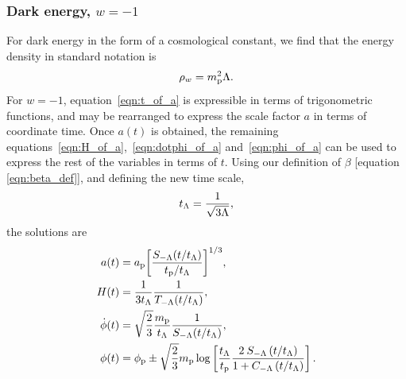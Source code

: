 \subsubsection{Dark energy, $w=-1$}
For dark energy in the form of a cosmological constant, we find that the energy density in standard notation is
%
\begin{equation}
  \rho_w = m_{\mathrm{p}}^2\Lambda.
\end{equation}
%
For $w=-1$, equation~\eqref{eqn:t_of_a} is expressible in terms of trigonometric functions, and may be rearranged to express the scale factor $a$ in terms of coordinate time. Once $a(t)$ is obtained, the remaining equations~\eqref{eqn:H_of_a},~\eqref{eqn:dotphi_of_a} and~\eqref{eqn:phi_of_a} can be used to express the rest of the variables in terms of $t$. Using our definition of $\beta$ [equation \nolinebreak\ref{eqn:beta_def}], and defining the new time scale,
%
\begin{equation}
  t_\mathrm{\Lambda} = \frac{1}{\sqrt{3\Lambda}},
  \label{eqn:tl}
\end{equation}
%
the solutions are
%
\begin{align}
  a(t)
  &=
  a_{\mathrm{p}}{\left[{\frac {S_{-\Lambda}(t/t_\mathrm{\Lambda})}{t_{\mathrm{p}}/t_\mathrm{\Lambda}}}\right]}^{1/3},
  \\
  H(t)
  &=
  \frac{1}{3t_\mathrm{\Lambda}}\frac{1}{T_{-\Lambda}(t/t_\mathrm{\Lambda})},
  \\
  \dot{\phi}(t)
  &=
  \sqrt{\frac{2}{3}}\frac{m_{\mathrm{p}}}{t_\mathrm{\Lambda}}\frac{1}{S_{-\Lambda}(t/t_\mathrm{\Lambda})},
  \\
  \phi(t)
  &=
  \phi_{\mathrm{p}} \pm \sqrt{\frac{2}{3}}m_{\mathrm{p}}
  \log\left[
  \frac{t_\mathrm{\Lambda}}{t_{\mathrm{p}}} 
  \frac 
  {2\: S_{-\Lambda} \left( t/t_\mathrm{\Lambda} \right) }
  {1 + C_{-\Lambda} \left( t/t_\mathrm{\Lambda} \right)}  
  \right].
\end{align}
%

